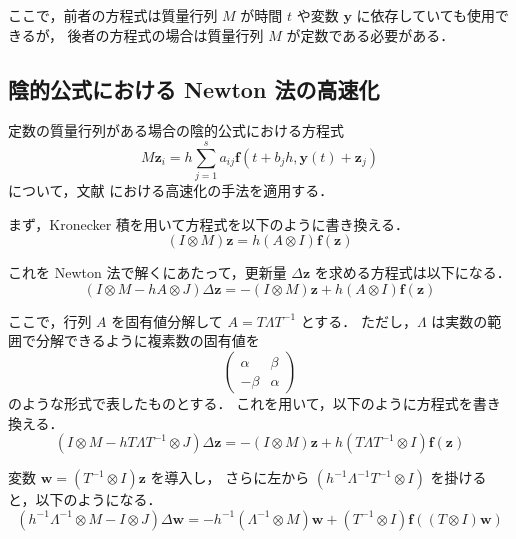 ここで，前者の方程式は質量行列 $M$ が時間 $t$ や変数 $\bm{y}$ に依存していても使用できるが，
後者の方程式の場合は質量行列 $M$ が定数である必要がある．

\subsection{陰的公式における Newton 法の高速化}

定数の質量行列がある場合の陰的公式における方程式
\begin{equation}
    M \bm{z}_i = h \sum_{j = 1}^s a_{ij} \bm{f}\left(t + b_j h, \bm{y}(t) + \bm{z}_j \right)
\end{equation}
について，文献 \cite{Hairer1991} における高速化の手法を適用する．

まず，Kronecker 積を用いて方程式を以下のように書き換える．
\begin{equation}
    (I \otimes M) \bm{z} = h (A \otimes I) \bm{f}(\bm{z})
\end{equation}

これを Newton 法で解くにあたって，更新量 $\Delta \bm{z}$ を求める方程式は以下になる．
\begin{equation}
    (I \otimes M - h A \otimes J) \Delta \bm{z} = -(I \otimes M) \bm{z} + h (A \otimes I) \bm{f}(\bm{z})
\end{equation}

ここで，行列 $A$ を固有値分解して
$A = T \Lambda T^{-1}$
とする．
ただし，$\Lambda$ は実数の範囲で分解できるように複素数の固有値を
\begin{equation}
    \begin{pmatrix}
        \alpha & \beta  \\
        -\beta & \alpha
    \end{pmatrix}
\end{equation}
のような形式で表したものとする．
これを用いて，以下のように方程式を書き換える．
\begin{equation}
    (I \otimes M - h T \Lambda T^{-1} \otimes J) \Delta \bm{z}
    = -(I \otimes M) \bm{z} + h (T \Lambda T^{-1} \otimes I) \bm{f}(\bm{z})
\end{equation}

変数 $\bm{w} = (T^{-1} \otimes I) \bm{z}$ を導入し，
さらに左から $(h^{-1} \Lambda^{-1} T^{-1} \otimes I)$ を掛けると，以下のようになる．
\begin{equation}
    (h^{-1} \Lambda^{-1} \otimes M - I \otimes J) \Delta \bm{w}
    = -h^{-1} (\Lambda^{-1} \otimes M) \bm{w} + (T^{-1} \otimes I) \bm{f}((T \otimes I) \bm{w})
\end{equation}

